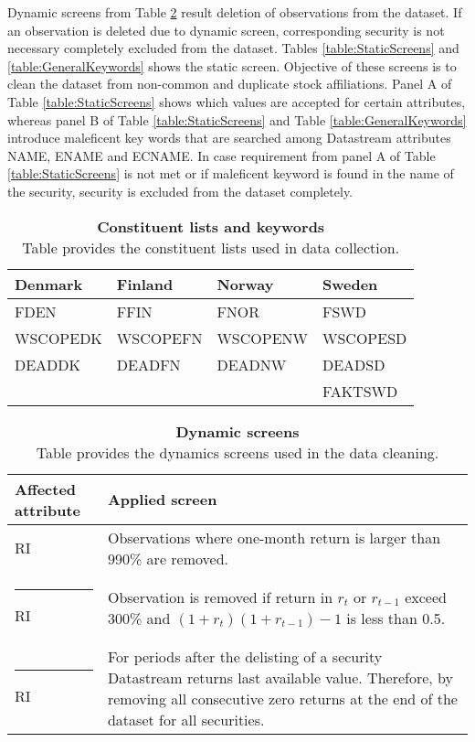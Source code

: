 \documentclass[12pt]{article}
\begin{document}
Dynamic screens from Table \ref{table:DynamicScreens} result deletion of observations from the dataset. If an observation is deleted due to dynamic screen, corresponding security is not necessary completely excluded from the dataset. Tables \ref{table:StaticScreens} and \ref{table:GeneralKeywords} shows the static screen. Objective of these screens is to clean the dataset from non-common and duplicate stock affiliations. Panel A of Table \ref{table:StaticScreens} shows which values are accepted for certain attributes, whereas panel B of Table \ref{table:StaticScreens} and Table \ref{table:GeneralKeywords} introduce maleficent key words that are searched among Datastream attributes NAME, ENAME and ECNAME. In case requirement from panel A of Table \ref{table:StaticScreens} is not met or if maleficent keyword is found in the name of the security, security is excluded from the dataset completely. \par

\begin{table}[ht] 
\footnotesize
\caption[Constituent lists and keywords]{\textbf{Constituent lists and keywords}\\ Table provides the constituent lists used in data collection.}
 \label{table:constituteLists}
\centering
\begin{tabularx}{\textwidth}{X X X X}
\toprule
Denmark & Finland & Norway & Sweden \\
\midrule
FDEN 		&  FFIN		& FNOR		& FSWD\\
WSCOPEDK & WSCOPEFN & WSCOPENW& WSCOPESD\\
DEADDK 	&   DEADFN 	& DEADNW 	& DEADSD\\
& & & FAKTSWD\\
 \bottomrule
 \end{tabularx}
 \end{table} 
 
\begin{table}[ht] 
\footnotesize
\caption[Dynamic screens]{\textbf{Dynamic screens}\\ Table provides the dynamics screens used in the data cleaning.}
 \label{table:DynamicScreens}
\centering
\begin{tabularx}{\textwidth}{l X}
\toprule
Affected attribute & Applied screen \\
\midrule
RI 		& Observations where one-month return is larger than 990\% are removed.\\ \rule{-1ex}{3ex}
RI		& Observation is removed if return in $r_t$ or $r_{t-1}$ exceed 300\% and $(1+r_{t})(1+r_{t-1}) -1$ is less than 0.5. \\ \rule{-1ex}{3ex}
RI 		& For periods after the delisting of a security Datastream returns last available value. Therefore, by removing all consecutive zero returns at the end of the dataset for all securities.\\
 \bottomrule
 \end{tabularx}
 \end{table} 
\end{document}
